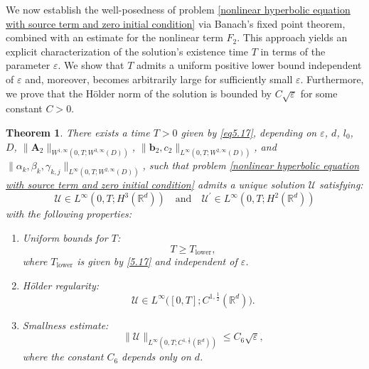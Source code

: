 \documentclass[11pt,reqno,oneside]{amsart}
\numberwithin{equation}{section}
\newtheorem{theorem}{Theorem}[section]
\theoremstyle{definition}
\theoremstyle{remark}
\numberwithin{equation}{section}
\begin{document}
We now establish the well-posedness of problem \eqref{nonlinear hyperbolic equation with source term and zero initial condition} via Banach's fixed point theorem, combined with an estimate for the nonlinear term $F_2$. This approach yields an explicit characterization of the solution's existence time $T$ in terms of the parameter $\varepsilon$. We show that $T$ admits a uniform positive lower bound independent of $\varepsilon$ and, moreover, becomes arbitrarily large for sufficiently small $\varepsilon$. Furthermore, we prove that the Hölder norm of the solution is bounded by $C \sqrt{\varepsilon}$ for some constant $C > 0$.
	
	\begin{theorem}\label{thm:5.2}
		There exists a time $ T > 0 $ given by \eqref{eq5.17}, depending on $ \varepsilon $, $ d $, $ l_0 $, $ D $, $ \|\mathbf{A}_2\|_{W^{1,\infty}(0,T; W^{3,\infty}(D))} $, $ \|\mathbf{b}_2, c_2\|_{L^{\infty}(0,T; W^{2,\infty}(D))} $, and $\|\alpha_k, \beta_k, \gamma_{k,j}\|_{L^{\infty}(0,T; W^{2,\infty}(D))} $, such that problem \eqref{nonlinear hyperbolic equation with source term and zero initial condition} admits a unique solution $ \mathscr{U} $ satisfying:
		$$
		\mathscr{U} \in L^{\infty}(0, T; H^3(\mathbb{R}^d)) \quad \text{and} \quad \mathscr{U}^{\prime} \in L^{\infty}(0, T; H^2(\mathbb{R}^d))
		$$
		with the following properties:
		\begin{enumerate}
			\item Uniform bounds for $T$: 
			$$
			T\geqslant T_{\mathrm{lower}} 	,
			$$
			where $T_{\mathrm{lower}}$ is given by \eqref{5.17}  and independent of $\varepsilon$.
			\item  H\"older regularity:
			$$
			\mathscr{U} \in L^{\infty}\big([0,T]; C^{1,\frac{1}{2}}(\mathbb{R}^d)\big).
			$$
			\item Smallness estimate:
			$$
			\|\mathscr{U}\|_{L^{\infty}(0,T;C^{1,\frac{1}{2}}(\mathbb{R}^d)) }\leqslant C_6 \sqrt{\varepsilon},
			$$
			where the constant $C_6$ depends only on $d$.
		\end{enumerate}
	\end{theorem}
\end{document}
